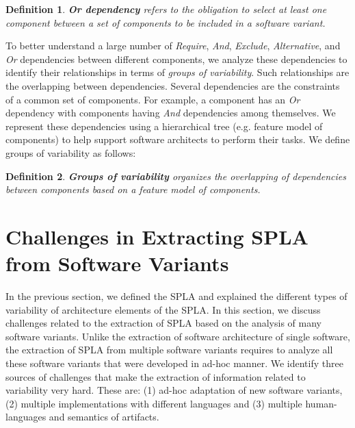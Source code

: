 \documentclass[graybox]{svmult}
\newtheorem{mydef}{Definition}
\begin{document}
\begin{mydef}
\textbf{Or dependency} refers to the obligation to select at least one component between a set of components to be included in a software variant. 
\end{mydef}

To better understand a large number of \textit{Require}, \textit{And},  \textit{Exclude}, \textit{Alternative}, and \textit{Or} dependencies between different components, we analyze these dependencies to identify their relationships in terms of \textit{groups of variability}. Such relationships are the overlapping between dependencies. 
Several dependencies are the constraints of a common set of components. For example, a component has an \textit{Or} dependency with components having \textit{And} dependencies among themselves. We represent these dependencies using a hierarchical tree (e.g. feature model of components) to help support software architects to perform their tasks. We define groups of variability as follows:

\begin{mydef}
\textbf{Groups of variability} organizes the overlapping of dependencies between components based on a feature model of components. 
\end{mydef}







\section{Challenges in Extracting SPLA from Software Variants}
\label{sec-challanges}
In the previous section, we defined the SPLA and explained the different types of variability of architecture elements of the SPLA. In this section, we discuss challenges related to the extraction of SPLA based on the analysis of many software variants. Unlike the extraction of software architecture of single software, the extraction of SPLA from multiple software variants requires to analyze all these software variants that were developed in ad-hoc manner. 
We identify three sources of challenges that make the extraction of information related to variability very hard. These are: (1) ad-hoc adaptation of new software variants, (2) multiple implementations with different languages and (3) multiple human-languages and semantics of artifacts.
\end{document}
